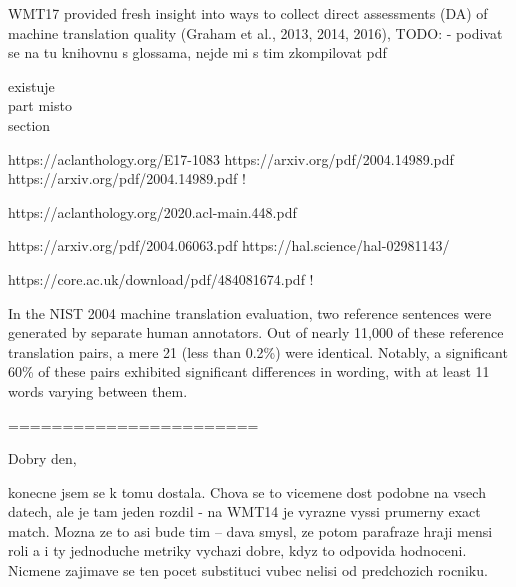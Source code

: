 WMT17
provided fresh insight into ways to collect direct assessments (DA) of machine translation quality (Graham et al., 2013, 2014, 2016),
TODO:
- podivat se na tu knihovnu s glossama, nejde mi s tim zkompilovat pdf


existuje \\part misto \\ section

https://aclanthology.org/E17-1083
https://arxiv.org/pdf/2004.14989.pdf
https://arxiv.org/pdf/2004.14989.pdf !


https://aclanthology.org/2020.acl-main.448.pdf


https://arxiv.org/pdf/2004.06063.pdf
https://hal.science/hal-02981143/


https://core.ac.uk/download/pdf/484081674.pdf !


In the NIST 2004 machine translation evaluation, two reference sentences were generated by separate human annotators. Out of nearly 11,000 of these reference translation pairs, a mere 21 (less than 0.2\%)  were identical. Notably, a significant 60\% of these pairs exhibited significant differences in wording, with at least 11 words varying between them. \citep{kauchak}







\caption{Example of the targeted paraphrasing. The~hypothesis is grammatically 
correct and has very similar meaning as the reference sentence. The new reference is closer 
in wording to the hypothesis, but the agreement between the noun and the adjective is broken. 
Depfix resolves the error and the final reference is correct. Number of overlapping unigrams
increased from 2 to 4.}






=======================

Dobry den,

konecne jsem se k tomu dostala. Chova se to vicemene dost podobne na vsech datech, ale je tam jeden
rozdil - na WMT14 je vyrazne vyssi prumerny exact match. Mozna ze to asi bude tim -- dava smysl,
ze potom parafraze hraji mensi roli a i ty jednoduche metriky vychazi dobre, kdyz to odpovida hodnoceni.
Nicmene zajimave se ten pocet substituci vubec nelisi od predchozich rocniku.

